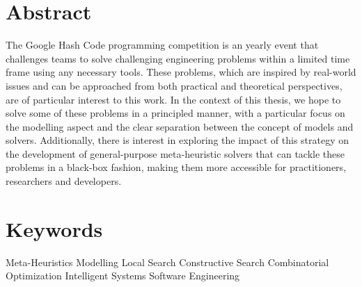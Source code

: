 \thispagestyle{plain}

\chapter*{Abstract}
\label{sec:abstract}

The Google Hash Code programming competition is an yearly event that
challenges teams to solve challenging engineering problems within a limited
time frame using any necessary tools. These problems, which are inspired
by real-world issues and can be approached from both practical and theoretical perspectives,
are of particular interest to this work. In the context of this thesis,
we hope to solve some of these problems in a principled manner, with a particular
focus on the modelling aspect and the clear separation between the concept of models
and solvers. Additionally, there is interest in exploring the impact of
this strategy on the development of general-purpose meta-heuristic solvers that
can tackle these problems in a black-box fashion, making them more accessible
for practitioners, researchers and developers.

\chapter*{Keywords}
\label{sec:keywords}
Meta-Heuristics \textbullet{}
Modelling \textbullet{}
Local Search \textbullet{}
Constructive Search \textbullet{}
Combinatorial Optimization \textbullet{}
Intelligent Systems \textbullet{}
Software Engineering
